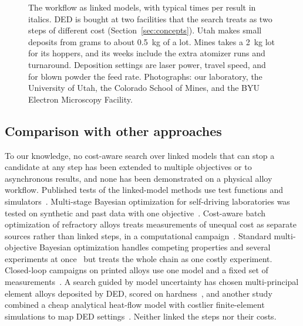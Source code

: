 \documentclass[12pt,letterpaper]{article}
\begin{document}
\begin{figure}[t]
\caption{The workflow as linked models, with typical times per result in
italics. DED is bought at two facilities that the search treats as two steps
of different cost (Section~\ref{sec:concepts}). Utah makes small deposits
from grams to about 0.5~kg of a lot. Mines takes a 2~kg lot for its hoppers,
and its weeks include the extra atomizer runs and turnaround. Deposition
settings are laser power, travel speed, and for blown powder the feed rate.
Photographs: our laboratory, the University of Utah, the Colorado School of
Mines, and the BYU Electron Microscopy Facility.}
\label{fig:network}
\end{figure}

\subsection{Comparison with other approaches}

To our knowledge, no cost-aware search over linked models that can stop a
candidate at any step has been extended to multiple objectives or to
asynchronous results, and none has been demonstrated on a physical alloy
workflow. Published tests of the linked-model methods use test functions and
simulators~\cite{astudillo2021,buathong2024}. Multi-stage Bayesian
optimization for self-driving laboratories was tested on synthetic and
past data with one objective~\cite{torresi2026}. Cost-aware batch
optimization of refractory alloys treats measurements of unequal cost as
separate sources rather than linked steps, in a computational
campaign~\cite{alvi2026}. Standard multi-objective Bayesian optimization
handles competing properties and several experiments at
once~\cite{daulton2021} but treats the whole chain as one costly experiment.
Closed-loop campaigns on printed alloys use one model and a fixed set of
measurements~\cite{talbot2026}. A search guided by model uncertainty has
chosen multi-principal element alloys deposited by DED,
scored on hardness~\cite{nelaturu2024}, and another study combined a cheap
analytical heat-flow model with costlier finite-element simulations to map
DED settings~\cite{menon2022}. Neither linked the steps nor their costs.
\end{document}

